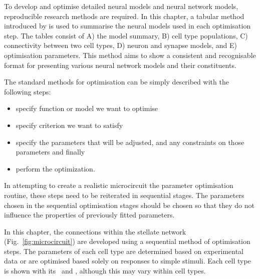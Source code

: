 

To develop and optimise detailed neural models and neural network models,
reproducible research methods are required. In this chapter, a tabular method
introduced by \citet{NordlieGewaltigEtAl:2009} is used to summarise the neural
models used in each optimisation step. The tables consist of A) the model
summary, B) cell type populations, C) connectivity between two cell types, D)
neuron and synapse models, and E) optimisation parameters.  This method aims to
show a consistent and recognisable format for presenting various neural network
models and their constituents. 


The standard methods for optimisation can be simply described with the following
steps:\begin{itemize}
\item specify function or model we want to optimise
\item specify criterion we want to satisfy
\item specify the parameters that will be adjusted, 
  and any constraints on those parameters and finally
\item perform the optimization.
\end{itemize}
In attempting to create a realistic microcircuit the parameter optimisation
routine, these steps need to be reiterated in sequential stages. The parameters
chosen in the sequential optimisation stages should be chosen so that they do
not influence the properties of previously fitted parameters.


In this chapter, the connections within the stellate network
(Fig.~\ref{fig:microcircuit}) are developed using a sequential method of
optimisation steps.  The parameters of each cell type are determined based on
experimental data or are optimised based solely on responses to simple stimuli.
Each cell type is shown with its \EIRA~and \PSTH, although this may
vary within cell types.


